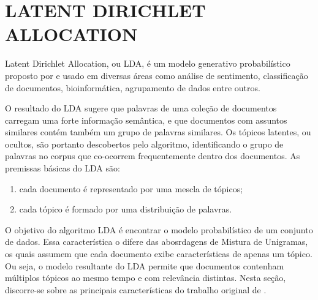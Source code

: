 \documentclass[12pt,a4paper]{article}
\begin{document}
  

  
  
  \section{LATENT DIRICHLET ALLOCATION}
  Latent Dirichlet Allocation, ou LDA, é um modelo generativo probabilístico proposto por  e usado em diversas áreas como análise de sentimento,
   classificação de documentos, bioinformática, agrupamento de dados entre outros. 
   
   O resultado do LDA sugere que palavras de uma coleção de documentos carregam uma forte informação semântica,
   e que documentos com assuntos similares contém também um grupo de palavras similares. Os tópicos latentes, ou ocultos,
   são portanto descobertos pelo algoritmo, identificando o grupo de palavras no corpus que co-ocorrem frequentemente dentro dos documentos. As premissas  básicas do LDA são:
  
  \begin{enumerate}
    \item cada documento é representado por uma mescla de tópicos;
    \item cada tópico é formado por uma distribuição de palavras.
  \end{enumerate}
  
  O objetivo do algoritmo LDA é encontrar o modelo probabilístico de um conjunto de dados. Essa característica o difere das abosrdagens de Mistura de Unigramas, os quais assumem que cada documento exibe características de apenas um tópico. Ou seja, o modelo resultante do LDA  permite que documentos contenham múltiplos tópicos ao mesmo tempo e com relevância distintas. Nesta seção, discorre-se sobre as principais características do trabalho original de .
   
\end{document}

